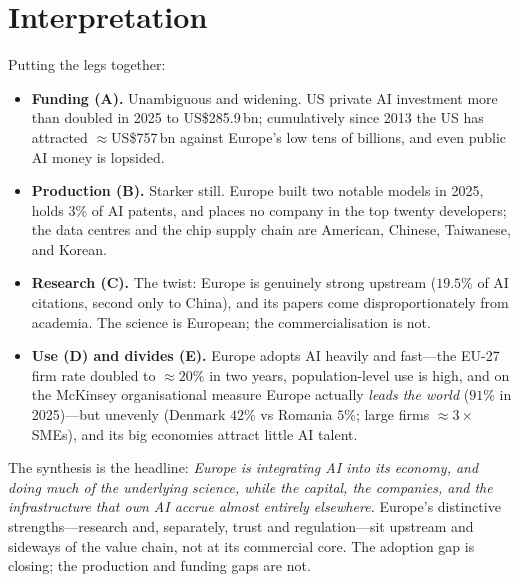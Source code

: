 \documentclass[11pt,a4paper]{article}
\begin{document}
\section{Interpretation}\label{sec:interpretation}

Putting the legs together:
\begin{itemize}
  \item \textbf{Funding (A).} Unambiguous and widening. US private AI investment
  more than doubled in 2025 to US\$285.9\,bn; cumulatively since 2013 the US has
  attracted $\approx$US\$757\,bn against Europe's low tens of billions, and even
  public AI money is lopsided.
  \item \textbf{Production (B).} Starker still. Europe built two notable models in
  2025, holds $3\%$ of AI patents, and places no company in the top twenty
  developers; the data centres and the chip supply chain are American, Chinese,
  Taiwanese, and Korean.
  \item \textbf{Research (C).} The twist: Europe is genuinely strong upstream
  ($19.5\%$ of AI citations, second only to China), and its papers come
  disproportionately from academia. The science is European; the
  commercialisation is not.
  \item \textbf{Use (D) and divides (E).} Europe adopts AI heavily and fast---the
  EU-27 firm rate doubled to $\approx 20\%$ in two years, population-level use is
  high, and on the McKinsey organisational measure Europe actually \emph{leads the
  world} ($91\%$ in 2025)---but unevenly (Denmark $42\%$ vs Romania $5\%$; large
  firms $\approx 3\times$ SMEs), and its big economies attract little AI talent.
\end{itemize}
The synthesis is the headline: \emph{Europe is integrating AI into its economy,
and doing much of the underlying science, while the capital, the companies, and
the infrastructure that \emph{own} AI accrue almost entirely elsewhere.} Europe's
distinctive strengths---research and, separately, trust and regulation---sit
upstream and sideways of the value chain, not at its commercial core. The
adoption gap is closing; the production and funding gaps are not.

\end{document}
